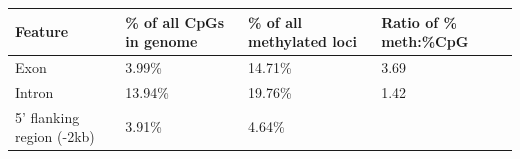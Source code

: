 \documentclass[
]{article}
\begin{document}
\begin{longtable}[]{@{}llll@{}}
\toprule
\begin{minipage}[b]{0.22\columnwidth}\raggedright
Feature\strut
\end{minipage} & \begin{minipage}[b]{0.22\columnwidth}\raggedright
\% of all CpGs in genome\strut
\end{minipage} & \begin{minipage}[b]{0.22\columnwidth}\raggedright
\% of all methylated loci\strut
\end{minipage} & \begin{minipage}[b]{0.22\columnwidth}\raggedright
Ratio of \% meth:\%CpG\strut
\end{minipage}\tabularnewline
\midrule
\endhead
\begin{minipage}[t]{0.22\columnwidth}\raggedright
Exon\strut
\end{minipage} & \begin{minipage}[t]{0.22\columnwidth}\raggedright
3.99\%\strut
\end{minipage} & \begin{minipage}[t]{0.22\columnwidth}\raggedright
14.71\%\strut
\end{minipage} & \begin{minipage}[t]{0.22\columnwidth}\raggedright
3.69\strut
\end{minipage}\tabularnewline
\begin{minipage}[t]{0.22\columnwidth}\raggedright
Intron\strut
\end{minipage} & \begin{minipage}[t]{0.22\columnwidth}\raggedright
13.94\%\strut
\end{minipage} & \begin{minipage}[t]{0.22\columnwidth}\raggedright
19.76\%\strut
\end{minipage} & \begin{minipage}[t]{0.22\columnwidth}\raggedright
1.42\strut
\end{minipage}\tabularnewline
\begin{minipage}[t]{0.22\columnwidth}\raggedright
5' flanking region (-2kb)\strut
\end{minipage} & \begin{minipage}[t]{0.22\columnwidth}\raggedright
3.91\%\strut
\end{minipage} & \begin{minipage}[t]{0.22\columnwidth}\raggedright
4.64\%\strut
\end{minipage} & \begin{minipage}[t]{0.22\columnwidth}\raggedright

\end{minipage}
\end{longtable}
\end{document}
